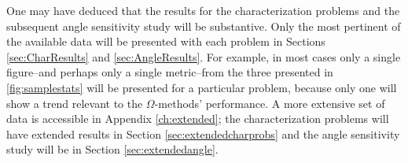 One may have deduced that the results for the characterization
problems and the subsequent angle
sensitivity study will be substantive. Only the most
pertinent of the available data will be presented with each problem in
Sections \ref{sec:CharResults} and \ref{sec:AngleResults}. For example, in most
cases only a single figure--and perhaps only a single metric--from the
three presented in \ref{fig:samplestats}
will be presented for a particular problem, because only one will show a trend
relevant to the $\Omega$-methods' performance.
A more extensive set of data is accessible in Appendix \ref{ch:extended}; the
characterization problems will have extended results in Section
\ref{sec:extendedcharprobs} and the angle sensitivity study will be in
Section \ref{sec:extendedangle}.

